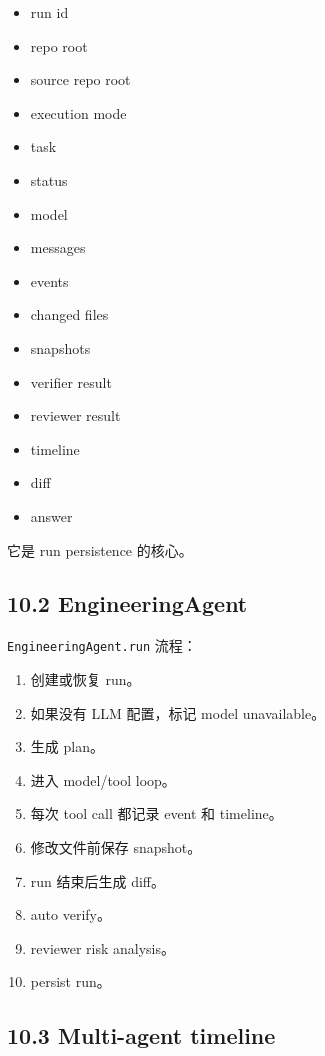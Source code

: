 \documentclass[UTF8,12pt,openany]{ctexbook}
\begin{document}
\begin{itemize}
\item run id
\item repo root
\item source repo root
\item execution mode
\item task
\item status
\item model
\item messages
\item events
\item changed files
\item snapshots
\item verifier result
\item reviewer result
\item timeline
\item diff
\item answer
\end{itemize}

它是 run persistence 的核心。\par

\subsection{10.2 EngineeringAgent}

\texttt{EngineeringAgent.run} 流程：\par

\begin{enumerate}
\item 创建或恢复 run。
\item 如果没有 LLM 配置，标记 model unavailable。
\item 生成 plan。
\item 进入 model/tool loop。
\item 每次 tool call 都记录 event 和 timeline。
\item 修改文件前保存 snapshot。
\item run 结束后生成 diff。
\item auto verify。
\item reviewer risk analysis。
\item persist run。
\end{enumerate}

\subsection{10.3 Multi-agent timeline}
\end{document}
